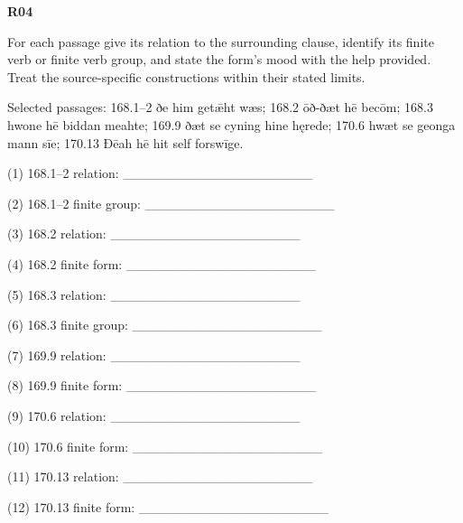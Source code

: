 \par\begin{minipage}{\linewidth}\raggedright
\textbf{R04}

For each passage give its relation to the surrounding clause, identify its finite verb or finite verb group, and state the form's mood with the help provided. Treat the source-specific constructions within their stated limits.

Selected passages: 168.1–2 ðe him getǣht wæs; 168.2 ōð-ðæt hē becōm; 168.3 hwone hē biddan meahte; 169.9 ðæt se cyning hine hęrede; 170.6 hwæt se geonga mann sīe; 170.13 Ðēah hē hit self forswīge.

(1) 168.1–2 relation: \_\_\_\_\_\_\_\_\_\_\_\_\_\_\_\_\_\_\_\_

(2) 168.1–2 finite group: \_\_\_\_\_\_\_\_\_\_\_\_\_\_\_\_\_\_\_\_

(3) 168.2 relation: \_\_\_\_\_\_\_\_\_\_\_\_\_\_\_\_\_\_\_\_

(4) 168.2 finite form: \_\_\_\_\_\_\_\_\_\_\_\_\_\_\_\_\_\_\_\_

(5) 168.3 relation: \_\_\_\_\_\_\_\_\_\_\_\_\_\_\_\_\_\_\_\_

(6) 168.3 finite group: \_\_\_\_\_\_\_\_\_\_\_\_\_\_\_\_\_\_\_\_

(7) 169.9 relation: \_\_\_\_\_\_\_\_\_\_\_\_\_\_\_\_\_\_\_\_

(8) 169.9 finite form: \_\_\_\_\_\_\_\_\_\_\_\_\_\_\_\_\_\_\_\_

(9) 170.6 relation: \_\_\_\_\_\_\_\_\_\_\_\_\_\_\_\_\_\_\_\_

(10) 170.6 finite form: \_\_\_\_\_\_\_\_\_\_\_\_\_\_\_\_\_\_\_\_

(11) 170.13 relation: \_\_\_\_\_\_\_\_\_\_\_\_\_\_\_\_\_\_\_\_

(12) 170.13 finite form: \_\_\_\_\_\_\_\_\_\_\_\_\_\_\_\_\_\_\_\_

\end{minipage}\par\addvspace{4pt}


